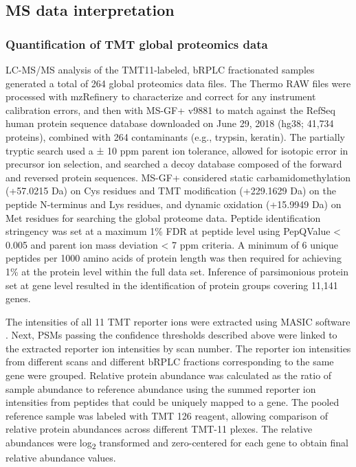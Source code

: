 \subsection{MS data interpretation}

\subsubsection{Quantification of TMT global proteomics data}
LC-MS/MS analysis of the TMT11-labeled, bRPLC fractionated samples generated a total of 264 global proteomics data files. The Thermo RAW files were processed with mzRefinery to characterize and correct for any instrument calibration errors, and then with MS-GF+ v9881 \cite{gibbonsbc_paynesh:CorrectingSystematic2015,kims_pevznerpa:MSGFMakes2014,kims_pevznerpa:SpectralProbabilities2008} to match against the RefSeq human protein sequence database downloaded on June 29, 2018 (hg38; 41,734 proteins), combined with 264 contaminants (e.g., trypsin, keratin). The partially tryptic search used a ± 10 ppm parent ion tolerance, allowed for isotopic error in precursor ion selection, and searched a decoy database composed of the forward and reversed protein sequences. MS-GF+ considered static carbamidomethylation (+57.0215 Da) on Cys residues and TMT modification (+229.1629 Da) on the peptide N-terminus and Lys residues, and dynamic oxidation (+15.9949 Da) on Met residues for searching the global proteome data.
Peptide identification stringency was set at a maximum 1\% FDR at peptide level using PepQValue < 0.005 and parent ion mass deviation < 7 ppm criteria. A minimum of 6 unique peptides per 1000 amino acids of protein length was then required for achieving 1\% at the protein level within the full data set. Inference of parsimonious protein set at gene level resulted in the identification of protein groups covering 11,141 genes.

The intensities of all 11 TMT reporter ions were extracted using MASIC software \cite{monroeme_smithrd:MASICSoftware2008}. Next, PSMs passing the confidence thresholds described above were linked to the extracted reporter ion intensities by scan number. The reporter ion intensities from different scans and different bRPLC fractions corresponding to the same gene were grouped. Relative protein abundance was calculated as the ratio of sample abundance to reference abundance using the summed reporter ion intensities from peptides that could be uniquely mapped to a gene. The pooled reference sample was labeled with TMT 126 reagent, allowing comparison of relative protein abundances across different TMT-11 plexes. The relative abundances were log\textsubscript{2} transformed and zero-centered for each gene to obtain final relative abundance values.

